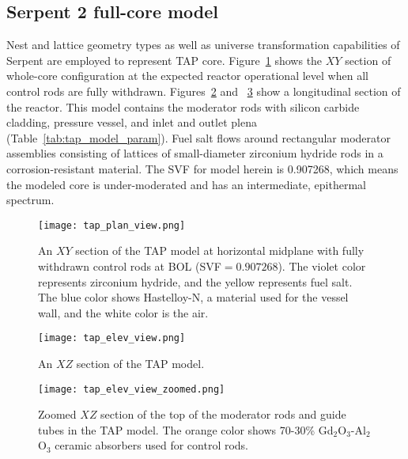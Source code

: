 \subsection{Serpent 2 full-core model} \label{sec:tap_model}
Nest and lattice geometry types as well as universe transformation 
capabilities of Serpent \cite{leppanen_serpent_2013} are employed to represent 
\gls{TAP} core. Figure~\ref{fig:tap-serpent-plan} shows the $XY$ section of 
whole-core
configuration at the expected reactor operational level when all
control rods are fully withdrawn. Figures~\ref{fig:tap-serpent-elev} and 
~\ref{fig:tap-serpent-elev-zoom} show a longitudinal section of the reactor. 
This model contains the moderator rods with silicon carbide cladding, pressure 
vessel, and inlet and outlet plena (Table~\ref{tab:tap_model_param}). Fuel 
salt flows around rectangular moderator assemblies consisting of lattices of 
small-diameter zirconium hydride rods in a corrosion-resistant material. The 
\gls{SVF} for model herein is 0.907268, which means the modeled core is 
under-moderated and has an intermediate, epithermal spectrum.
\begin{figure}[htp!] %
	\centering
	\texttt{[image: tap\_plan\_view.png]}
	\caption{An $XY$ section of the \gls{TAP} model at horizontal midplane 
		with fully withdrawn control rods at \gls{BOL} (\gls{SVF}$=0.907268$). 
		The violet color represents zirconium 
		hydride, and the yellow represents fuel salt. The blue color shows 
		Hastelloy-N, a material used for the vessel wall, and the white color 
		is the air.}
	\label{fig:tap-serpent-plan}
\end{figure}
\begin{figure}[htp!] %
	\centering
	\texttt{[image: tap\_elev\_view.png]}
	\caption{An $XZ$ section of the \gls{TAP} model.}
	\label{fig:tap-serpent-elev}
\end{figure}
\begin{figure}[htp!] %
	\centering
	\texttt{[image: tap\_elev\_view\_zoomed.png]}
	\caption{Zoomed $XZ$ section of the top of the moderator rods and guide 
	tubes in the \gls{TAP} model. The orange color shows 70-30\%  
	Gd$_2$O$_3$-Al$_2$O$_3$ ceramic absorbers used for control rods.}
	\label{fig:tap-serpent-elev-zoom}
\end{figure}

